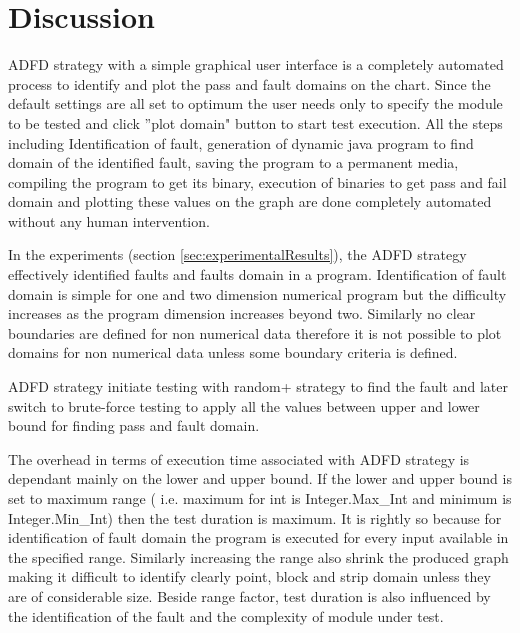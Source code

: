 \documentclass[runningheads,a4paper]{llncs}
\begin{document}



\section{Discussion} \label{sec:discussion}

ADFD strategy with a simple graphical user interface is a completely automated process to identify and plot the pass and fault domains on the chart. Since the default settings are all set to optimum the user needs only to specify the module to be tested and click ''plot domain" button to start test execution. All the steps including Identification of fault, generation of dynamic java program to find domain of the identified fault, saving the program to a permanent media, compiling the program to get its binary, execution of binaries to get pass and fail domain and plotting these values on the graph are done completely automated without any human intervention.

In the experiments (section \ref{sec:experimentalResults}), the ADFD strategy effectively identified faults and faults domain in a program. Identification of fault domain is simple for one and two dimension numerical program but the difficulty increases as the program dimension increases beyond two. Similarly no clear boundaries are defined for non numerical data therefore it is not possible to plot domains for non numerical data unless some boundary criteria is defined.

ADFD strategy initiate testing with random+ strategy to find the fault and later switch to brute-force testing to apply all the values between upper and lower bound for finding pass and fault domain.

The overhead in terms of execution time associated with ADFD strategy is dependant mainly on the lower and upper bound. If the lower and upper bound is set to maximum range ( i.e. maximum for int is Integer.Max\_Int and minimum is Integer.Min\_Int) then the test duration is maximum.    It is rightly so because for identification of fault domain the program is executed for every input available in the specified range. Similarly increasing the range also shrink the produced graph making it difficult to identify clearly point, block and strip domain unless they are of considerable size. Beside range factor, test duration is also influenced by the identification of the fault and the complexity of module under test.
\end{document}
